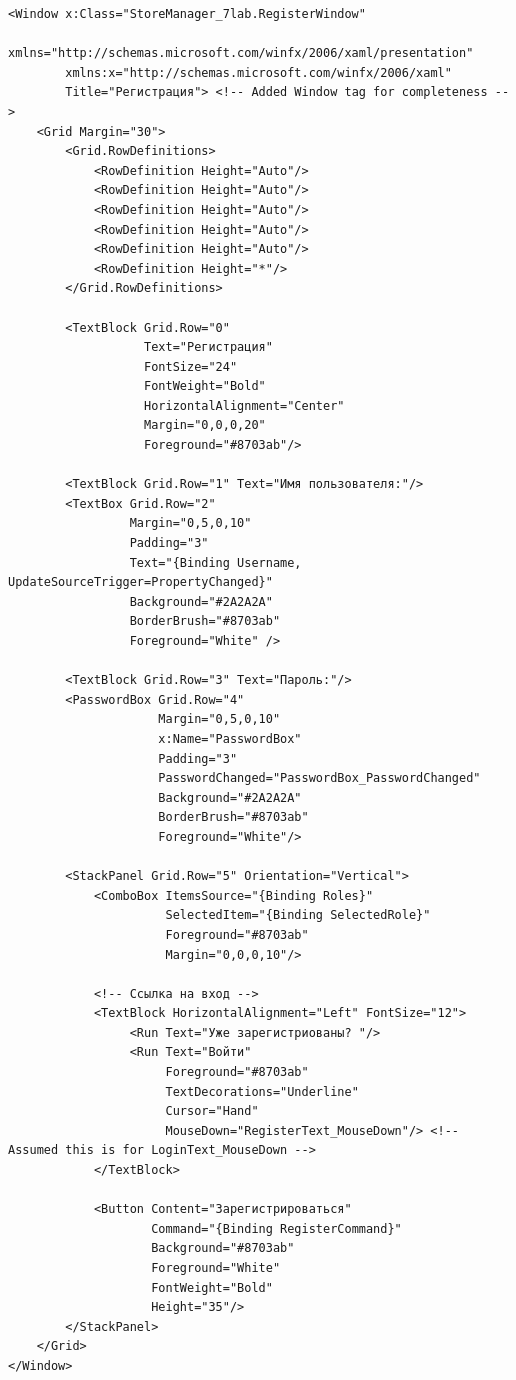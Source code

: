 \documentclass[12pt]{article}
\newcommand{\colorGIT}[1]{\textcolor{CtpLavender}{#1}}
\renewcommand{\texttt}[1]{{\small\ttfamily #1}}
\newenvironment{code}
  {\par\captionsetup{type=listing}\noindent}
  {\par\vspace{\baselineskip}}
\numberwithin{listing}{section}
\numberwithin{figure}{section}
\begin{document}
\begin{code}
	\begin{verbatim}
<Window x:Class="StoreManager_7lab.RegisterWindow"
        xmlns="http://schemas.microsoft.com/winfx/2006/xaml/presentation"
        xmlns:x="http://schemas.microsoft.com/winfx/2006/xaml"
        Title="Регистрация"> <!-- Added Window tag for completeness -->
    <Grid Margin="30">
        <Grid.RowDefinitions>
            <RowDefinition Height="Auto"/>
            <RowDefinition Height="Auto"/>
            <RowDefinition Height="Auto"/>
            <RowDefinition Height="Auto"/>
            <RowDefinition Height="Auto"/>
            <RowDefinition Height="*"/>
        </Grid.RowDefinitions>

        <TextBlock Grid.Row="0"
                   Text="Регистрация"
                   FontSize="24"
                   FontWeight="Bold"
                   HorizontalAlignment="Center"
                   Margin="0,0,0,20"
                   Foreground="#8703ab"/>

        <TextBlock Grid.Row="1" Text="Имя пользователя:"/>
        <TextBox Grid.Row="2"
                 Margin="0,5,0,10"
                 Padding="3"
                 Text="{Binding Username, UpdateSourceTrigger=PropertyChanged}"
                 Background="#2A2A2A"
                 BorderBrush="#8703ab"
                 Foreground="White" />

        <TextBlock Grid.Row="3" Text="Пароль:"/>
        <PasswordBox Grid.Row="4"
                     Margin="0,5,0,10"
                     x:Name="PasswordBox"
                     Padding="3"
                     PasswordChanged="PasswordBox_PasswordChanged"
                     Background="#2A2A2A"
                     BorderBrush="#8703ab"
                     Foreground="White"/>

        <StackPanel Grid.Row="5" Orientation="Vertical">
            <ComboBox ItemsSource="{Binding Roles}"
                      SelectedItem="{Binding SelectedRole}"  
                      Foreground="#8703ab"
                      Margin="0,0,0,10"/>

            <!-- Ссылка на вход -->
            <TextBlock HorizontalAlignment="Left" FontSize="12">
                 <Run Text="Уже зарегистриованы? "/>
                 <Run Text="Войти"
                      Foreground="#8703ab"
                      TextDecorations="Underline"
                      Cursor="Hand"
                      MouseDown="RegisterText_MouseDown"/> <!-- Assumed this is for LoginText_MouseDown -->
            </TextBlock>

            <Button Content="Зарегистрироваться"
                    Command="{Binding RegisterCommand}"
                    Background="#8703ab"
                    Foreground="White"
                    FontWeight="Bold"
                    Height="35"/>
        </StackPanel>
    </Grid>
</Window>
\end{verbatim}
	\caption{Разметка окна регистрации (\colorGIT{\href{https://github.com/WebMasterIT/Csharp_Labs/blob/main/7_lab_WPF/StoreManager_7lab/StoreManager_7lab/RegisterWindow.xaml}{\texttt{RegisterWindow.xaml}}})}
	\label{lst:register_form_markup}
\end{code}
\end{document}
